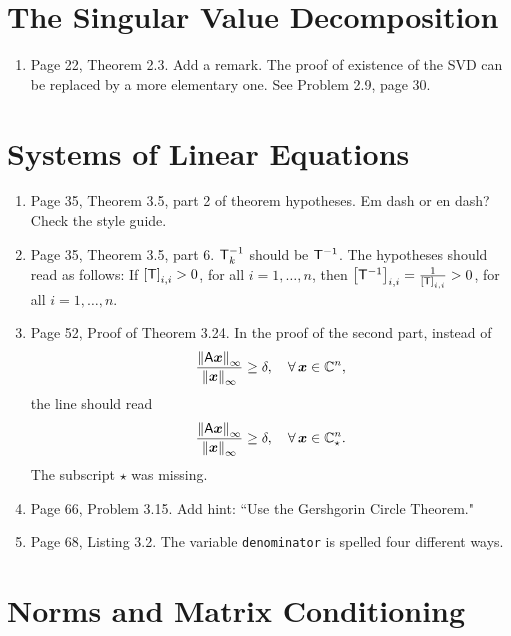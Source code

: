 \documentclass{book}
\begin{document}
	\chapter{The Singular Value Decomposition}
	
	\begin{enumerate}
	\item
Page 22, Theorem 2.3. Add a remark. The proof of existence of the SVD can be replaced by a more elementary one. See Problem 2.9, page 30.
	\end{enumerate}
	
	\chapter{Systems of Linear Equations}
	
	\begin{enumerate}
	\item 
Page 35, Theorem 3.5, part 2 of theorem hypotheses. Em dash or en dash? Check the style guide.
	\item 
Page 35, Theorem 3.5, part 6. $\mathsf{T}_k^{-1}$ should be $\mathsf{T}^{-1}$. The hypotheses should read as follows: If $\left[ \mathsf{T} \right]_{i,i} >0$, for all $i =1, \ldots , n$, then  $\left[ \mathsf{T}^{-1} \right]_{i,i} = \frac{1}{\left[ \mathsf{T} \right]_{i,i}} > 0$, for all $i =1, \ldots , n$.

	\item
Page 52, Proof of Theorem 3.24. In the proof of the second part, instead of 
	\[
\frac{\left\| \mathsf{A}\boldsymbol{x} \right\|_\infty}{\left\| \boldsymbol{x} \right\|_\infty} \ge \delta, \quad \forall \, \boldsymbol{x} \in \mathbb C^n,
	\]
the line should read
	\[
\frac{\left\| \mathsf{A}\boldsymbol{x} \right\|_\infty}{\left\| \boldsymbol{x} \right\|_\infty} \ge \delta, \quad \forall \, \boldsymbol{x} \in \mathbb C_\star^n.	
	\]
The subscript $\star$ was missing.

	\item
Page 66, Problem 3.15. Add hint: ``Use the Gershgorin Circle Theorem."

	\item
Page 68, Listing 3.2. The variable {\tt denominator} is spelled four different ways.
	\end{enumerate}
	
	\chapter{Norms and Matrix Conditioning}
	
\end{document}
